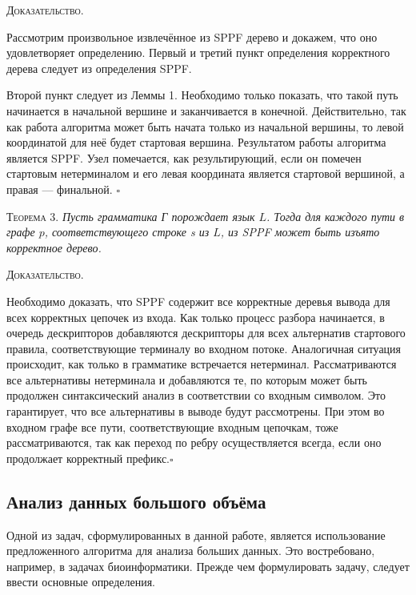 \documentclass[14pt]{matmex-diploma}
\begin{document}
\textsc{Доказательство.}

Рассмотрим произвольное извлечённое из SPPF дерево и докажем, что оно удовлетворяет определению. Первый и третий пункт определения корректного дерева следует из определения SPPF. 

Второй пункт следует из Леммы 1. Необходимо только показать, что такой путь начинается в начальной вершине и заканчивается в конечной. Действительно, так как работа алгоритма может быть начата только из начальной вершины, то левой координатой для неё будет стартовая вершина. Результатом работы алгоритма является SPPF. Узел помечается, как результирующий, если он помечен стартовым нетерминалом и его левая координата является стартовой вершиной, а правая --- финальной. $\square$

\textsc{Теорема 3.} 
\textit{Пусть грамматика Г порождает язык $L$. Тогда для каждого пути в графе $p$, соответствующего строке s из $L$, из SPPF может быть изъято корректное дерево.}

\textsc{Доказательство.}

Необходимо доказать, что SPPF содержит все корректные деревья вывода для всех корректных цепочек из входа. Как только процесс разбора начинается, в очередь дескрипторов добавляются дескрипторы для всех альтернатив стартового правила, соответствующие терминалу во входном потоке. Аналогичная ситуация происходит, как только в грамматике встречается нетерминал. Рассматриваются все альтернативы нетерминала и добавляются те, по которым может быть продолжен синтаксический анализ в соответствии со входным символом. Это гарантирует, что все альтернативы в выводе будут рассмотрены. При этом во входном графе все пути, соответствующие входным цепочкам, тоже рассматриваются, так как переход по ребру осуществляется всегда, если оно продолжает корректный префикс.$\square$

\subsection{Анализ данных большого объёма}
Одной из задач, сформулированных в данной работе, является использование предложенного алгоритма для анализа больших данных. Это востребовано, например, в задачах биоинформатики. Прежде чем формулировать задачу, следует ввести основные определения.
\end{document}
